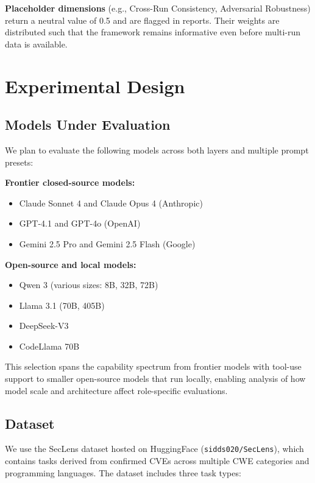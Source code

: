 \documentclass[10pt,twocolumn]{article}
\newcommand{\seclens}{SecLens\xspace}
\begin{document}
\textbf{Placeholder dimensions} (e.g., Cross-Run Consistency, Adversarial Robustness) return a neutral value of 0.5 and are flagged in reports. Their weights are distributed such that the framework remains informative even before multi-run data is available.

\section{Experimental Design}
\label{sec:experiments}

\subsection{Models Under Evaluation}
\label{sec:models}

We plan to evaluate the following models across both layers and multiple prompt presets:

\textbf{Frontier closed-source models:}
\begin{itemize}[noitemsep,topsep=2pt]
    \item Claude Sonnet 4 and Claude Opus 4 (Anthropic)
    \item GPT-4.1 and GPT-4o (OpenAI)
    \item Gemini 2.5 Pro and Gemini 2.5 Flash (Google)
\end{itemize}

\textbf{Open-source and local models:}
\begin{itemize}[noitemsep,topsep=2pt]
    \item Qwen 3 (various sizes: 8B, 32B, 72B)
    \item Llama 3.1 (70B, 405B)
    \item DeepSeek-V3
    \item CodeLlama 70B
\end{itemize}

This selection spans the capability spectrum from frontier models with tool-use support to smaller open-source models that run locally, enabling analysis of how model scale and architecture affect role-specific evaluations.

\subsection{Dataset}
\label{sec:dataset}

We use the \seclens dataset hosted on HuggingFace (\texttt{sidds020/SecLens}), which contains tasks derived from confirmed CVEs across multiple CWE categories and programming languages. The dataset includes three task types:
\end{document}
